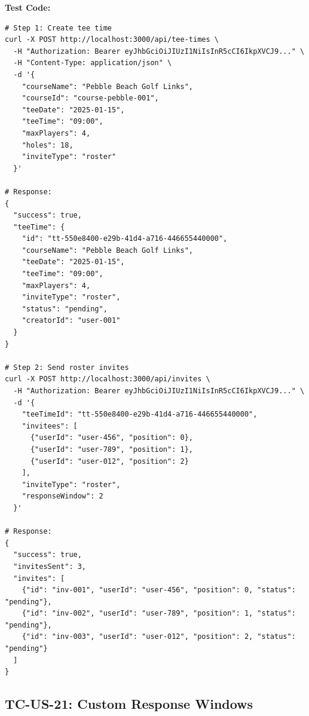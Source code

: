 \documentclass[11pt,a4paper]{article}
\begin{document}
\vspace{0.3cm}
\textbf{Test Code:}
\begin{lstlisting}
# Step 1: Create tee time
curl -X POST http://localhost:3000/api/tee-times \
  -H "Authorization: Bearer eyJhbGciOiJIUzI1NiIsInR5cCI6IkpXVCJ9..." \
  -H "Content-Type: application/json" \
  -d '{
    "courseName": "Pebble Beach Golf Links",
    "courseId": "course-pebble-001",
    "teeDate": "2025-01-15",
    "teeTime": "09:00",
    "maxPlayers": 4,
    "holes": 18,
    "inviteType": "roster"
  }'

# Response:
{
  "success": true,
  "teeTime": {
    "id": "tt-550e8400-e29b-41d4-a716-446655440000",
    "courseName": "Pebble Beach Golf Links",
    "teeDate": "2025-01-15",
    "teeTime": "09:00",
    "maxPlayers": 4,
    "inviteType": "roster",
    "status": "pending",
    "creatorId": "user-001"
  }
}

# Step 2: Send roster invites
curl -X POST http://localhost:3000/api/invites \
  -H "Authorization: Bearer eyJhbGciOiJIUzI1NiIsInR5cCI6IkpXVCJ9..." \
  -d '{
    "teeTimeId": "tt-550e8400-e29b-41d4-a716-446655440000",
    "invitees": [
      {"userId": "user-456", "position": 0},
      {"userId": "user-789", "position": 1},
      {"userId": "user-012", "position": 2}
    ],
    "inviteType": "roster",
    "responseWindow": 2
  }'

# Response:
{
  "success": true,
  "invitesSent": 3,
  "invites": [
    {"id": "inv-001", "userId": "user-456", "position": 0, "status": "pending"},
    {"id": "inv-002", "userId": "user-789", "position": 1, "status": "pending"},
    {"id": "inv-003", "userId": "user-012", "position": 2, "status": "pending"}
  ]
}
\end{lstlisting}

\vspace{0.5cm}


\subsection{TC-US-21: Custom Response Windows}
\end{document}
